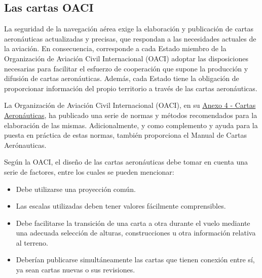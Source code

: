 \subsection{Las cartas OACI \protect\cite{Salazar_nav_aerea}}

La seguridad de la navegaci\'on a\'erea exige la elaboraci\'on y publicaci\'on de cartas aeron\'auticas actualizadas y precisas, que respondan a las necesidades actuales de la aviaci\'on. En consecuencia, corresponde a cada Estado miembro de la Organizaci\'on de Aviaci\'on Civil Internacional (OACI) adoptar las disposiciones necesarias para facilitar el esfuerzo de cooperaci\'on que supone la producci\'on y difusi\'on de cartas aeron\'auticas. Adem\'as, cada Estado tiene la obligaci\'on de proporcionar informaci\'on del propio territorio a trav\'es de las cartas aeron\'auticas.

La Organizaci\'on de Aviaci\'on Civil Internacional (OACI), en su 
\href{https://www.anac.gov.ar/anac/web/uploads/normativa/anexos-oaci/anexo-4.pdf}{Anexo 4 - Cartas Aeron\'auticas}, 
ha publicado una serie de normas y m\'etodos recomendados para la elaboraci\'on de las mismas. Adicionalmente, y como complemento y ayuda para la puesta en pr\'actica de estas normas, tambi\'en proporciona el Manual de Cartas Aer\'onauticas.

Seg\'un la OACI, el dise\~no de las cartas aeron\'auticas debe tomar en cuenta una serie de factores, entre los cuales se pueden mencionar:

\begin{itemize}

\item  Debe utilizarse una proyecci\'on com\'un.

  \item Las escalas utilizadas deben tener valores f\'acilmente
  comprensibles.

  \item Debe facilitarse la transici\'on de una carta a otra durante el
  vuelo mediante una adecuada selecci\'on de alturas, construcciones u
  otra informaci\'on relativa al terreno.

  \item Deber\'ian publicarse simult\'aneamente las cartas que tienen conexi\'on
  entre s\'i, ya sean cartas nuevas o sus revisiones.

\end{itemize}

%   

